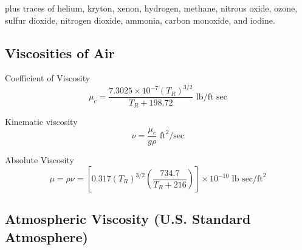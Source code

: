 \documentclass[
]{book}
\begin{document}
plus traces of helium, kryton, xenon, hydrogen, methane, nitrous oxide, ozone, sulfur dioxide, nitrogen dioxide, ammonia, carbon monoxide, and iodine.

\hypertarget{viscosities-of-air}{%
\subsection*{Viscosities of Air}\label{viscosities-of-air}}

Coefficient of Viscosity
\[ \mu_c = \frac{7.3025 \times 10^{-7} \left(T_R \right)^{3/2}}{T_R + 198.72} \text{ lb/ft sec}\]

Kinematic viscosity
\[ \nu = \frac{\mu_c}{g\rho} \text{ ft}^{2}\text{/sec} \]

Absolute Viscosity
\[ \mu = \rho\nu = \left[ 0.317 \left(T_R\right)^{3/2} \left( \frac{734.7}{T_R + 216} \right) \right] \times 10^{-10} \text{ lb sec/ft}^{2} \]

\hypertarget{atmospheric-viscosity-u.s.-standard-atmosphere}{%
\subsection*{Atmospheric Viscosity (U.S. Standard Atmosphere)}\label{atmospheric-viscosity-u.s.-standard-atmosphere}}
\end{document}
